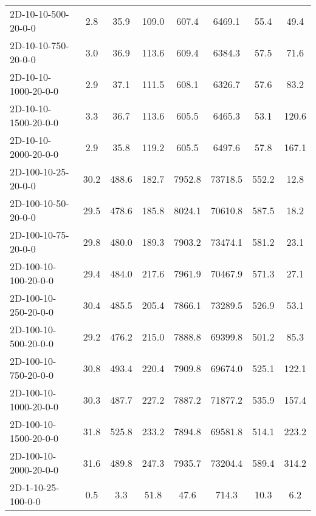 \documentclass{article}
\begin{document}
\begin{center}
\begin{table}[h]
\begin{tabular}{|l||c|c|c|c|c|c|c|}
            2D-10-10-500-20-0-0            & 2.8  & 35.9      & 109.0      & 607.4       & 6469.1   & 55.4      & 49.4       \\
            2D-10-10-750-20-0-0            & 3.0  & 36.9      & 113.6      & 609.4       & 6384.3   & 57.5      & 71.6       \\
            2D-10-10-1000-20-0-0           & 2.9  & 37.1      & 111.5      & 608.1       & 6326.7   & 57.6      & 83.2       \\
            2D-10-10-1500-20-0-0           & 3.3  & 36.7      & 113.6      & 605.5       & 6465.3   & 53.1      & 120.6      \\
            2D-10-10-2000-20-0-0           & 2.9  & 35.8      & 119.2      & 605.5       & 6497.6   & 57.8      & 167.1      \\
            \hline
            2D-100-10-25-20-0-0            & 30.2 & 488.6     & 182.7      & 7952.8      & 73718.5  & 552.2     & 12.8       \\
            2D-100-10-50-20-0-0            & 29.5 & 478.6     & 185.8      & 8024.1      & 70610.8  & 587.5     & 18.2       \\
            2D-100-10-75-20-0-0            & 29.8 & 480.0     & 189.3      & 7903.2      & 73474.1  & 581.2     & 23.1       \\
            2D-100-10-100-20-0-0           & 29.4 & 484.0     & 217.6      & 7961.9      & 70467.9  & 571.3     & 27.1       \\
            2D-100-10-250-20-0-0           & 30.4 & 485.5     & 205.4      & 7866.1      & 73289.5  & 526.9     & 53.1       \\
            2D-100-10-500-20-0-0           & 29.2 & 476.2     & 215.0      & 7888.8      & 69399.8  & 501.2     & 85.3       \\
            2D-100-10-750-20-0-0           & 30.8 & 493.4     & 220.4      & 7909.8      & 69674.0  & 525.1     & 122.1      \\
            2D-100-10-1000-20-0-0          & 30.3 & 487.7     & 227.2      & 7887.2      & 71877.2  & 535.9     & 157.4      \\
            2D-100-10-1500-20-0-0          & 31.8 & 525.8     & 233.2      & 7894.8      & 69581.8  & 514.1     & 223.2      \\
            2D-100-10-2000-20-0-0          & 31.6 & 489.8     & 247.3      & 7935.7      & 73204.4  & 589.4     & 314.2      \\
            \hline
            2D-1-10-25-100-0-0             & 0.5  & 3.3       & 51.8       & 47.6        & 714.3    & 10.3      & 6.2        \\

\end{tabular}
\end{table}
\end{center}
\end{document}

